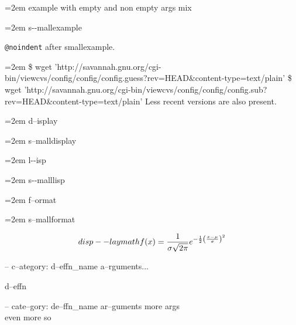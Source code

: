 \documentclass{book}
\begin{document}
\begin{titlepage}
\par\begingroup\obeylines\obeyspaces\frenchspacing\leftskip=2em\relax\parskip=0pt\relax\ttfamily{}%
example with empty and non empty args mix
\endgroup{}%

\par\begingroup\obeylines\obeyspaces\frenchspacing\leftskip=2em\relax\parskip=0pt\relax\ttfamily\footnotesize{}%
s{-}{-}mallexample
\endgroup{}%

\texttt{@noindent} after smallexample.
\par\begingroup\obeylines\obeyspaces\frenchspacing\leftskip=2em\relax\parskip=0pt\relax\ttfamily\footnotesize{}%
\$ wget 'http://savannah.gnu.org/cgi-bin/viewcvs/config/config/config.guess?rev=HEAD\&content-type=text/plain'
\$ wget 'http://savannah.gnu.org/cgi-bin/viewcvs/config/config/config.sub?rev=HEAD\&content-type=text/plain'
\endgroup{}%
\noindent{}Less recent versions are also present.

\par\begingroup\obeylines\obeyspaces\frenchspacing\leftskip=2em\relax\parskip=0pt\relax{}%
d--isplay
\endgroup{}%

\par\begingroup\obeylines\obeyspaces\frenchspacing\leftskip=2em\relax\parskip=0pt\relax\footnotesize{}%
s--malldisplay
\endgroup{}%

\par\begingroup\obeylines\obeyspaces\frenchspacing\leftskip=2em\relax\parskip=0pt\relax\ttfamily{}%
l{-}{-}isp
\endgroup{}%

\par\begingroup\obeylines\obeyspaces\frenchspacing\leftskip=2em\relax\parskip=0pt\relax\ttfamily\footnotesize{}%
s{-}{-}malllisp
\endgroup{}%

\par\begingroup\obeylines\obeyspaces\frenchspacing\leftskip=2em\relax\parskip=0pt\relax{}%
f--ormat
\endgroup{}%

\par\begingroup\obeylines\obeyspaces\frenchspacing\leftskip=2em\relax\parskip=0pt\relax\footnotesize{}%
s--mallformat
\endgroup{}%

$$
disp--laymath
f(x) = {1 \over \sigma \sqrt{2\pi}}e^{-{1 \over 2}\left({x-\mu \over \sigma}\right)^2}
$$

\hbox{}-- c--ategory: d--effn\_name a--rguments...


%
d--effn

\hbox{}-- cate--gory: de--ffn\_name ar--guments    more args \leavevmode{}\\ even more so



\end{titlepage}
\end{document}

